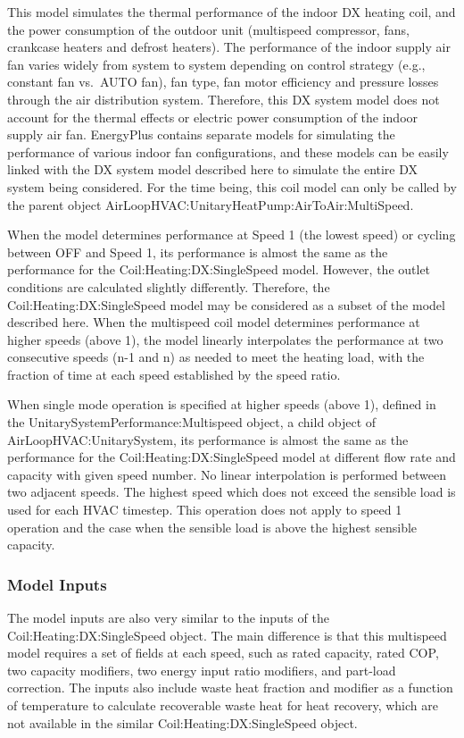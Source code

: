 This model simulates the thermal performance of the indoor DX heating coil, and the power consumption of the outdoor unit (multispeed compressor, fans, crankcase heaters and defrost heaters). The performance of the indoor supply air fan varies widely from system to system depending on control strategy (e.g., constant fan vs.~AUTO fan), fan type, fan motor efficiency and pressure losses through the air distribution system. Therefore, this DX system model does not account for the thermal effects or electric power consumption of the indoor supply air fan. EnergyPlus contains separate models for simulating the performance of various indoor fan configurations, and these models can be easily linked with the DX system model described here to simulate the entire DX system being considered. For the time being, this coil model can only be called by the parent object AirLoopHVAC:UnitaryHeatPump:AirToAir:MultiSpeed.

When the model determines performance at Speed 1 (the lowest speed) or cycling between OFF and Speed 1, its performance is almost the same as the performance for the Coil:Heating:DX:SingleSpeed model. However, the outlet conditions are calculated slightly differently. Therefore, the Coil:Heating:DX:SingleSpeed model may be considered as a subset of the model described here. When the multispeed coil model determines performance at higher speeds (above 1), the model linearly interpolates the performance at two consecutive speeds (n-1 and n) as needed to meet the heating load, with the fraction of time at each speed established by the speed ratio.

When single mode operation is specified at higher speeds (above 1), defined in the UnitarySystemPerformance:Multispeed object, a child object of AirLoopHVAC:UnitarySystem, its performance is almost the same as the performance for the Coil:Heating:DX:SingleSpeed model at different flow rate and capacity with given speed number. No linear interpolation is performed between two adjacent speeds. The highest speed which does not exceed the sensible load is used for each HVAC timestep. This operation does not apply to speed 1 operation and the case when the sensible load is above the highest sensible capacity.

\subsubsection{Model Inputs}\label{model-inputs-3}

The model inputs are also very similar to the inputs of the Coil:Heating:DX:SingleSpeed object. The main difference is that this multispeed model requires a set of fields at each speed, such as rated capacity, rated COP, two capacity modifiers, two energy input ratio modifiers, and part-load correction. The inputs also include waste heat fraction and modifier as a function of temperature to calculate recoverable waste heat for heat recovery, which are not available in the similar Coil:Heating:DX:SingleSpeed object.

